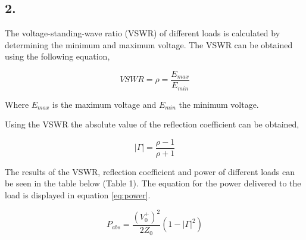 	
	
	
%
			
	\subsection*{2.}
	The voltage-standing-wave ratio (VSWR) of different loads is calculated by determining the minimum and maximum voltage. The VSWR can be obtained using the following equation,

	\begin{equation}
		\label{eq:vswr}
		VSWR = \rho = \frac{E_{max}}{E_{min}}
	\end{equation}
	
	\noindent Where $E_{max}$ is the maximum voltage and $E_{min}$ the minimum voltage.

	Using the VSWR the absolute value of the reflection coefficient can be obtained,

	\begin{equation}
		\label{abs_rfc}
		|\Gamma| = \frac{\rho - 1}{\rho + 1}
	\end{equation}

	The results of the VSWR, reflection coefficient and power of different loads can be seen in the table below (Table 1). The equation for the power delivered to the load is displayed in equation \ref{eq:power}.
	
	\begin{equation}
		\label{eq:power}
		P_{abs} = \frac{(V_0^+)^2}{2Z_0} (1 - |\Gamma|^2)
	\end{equation}

